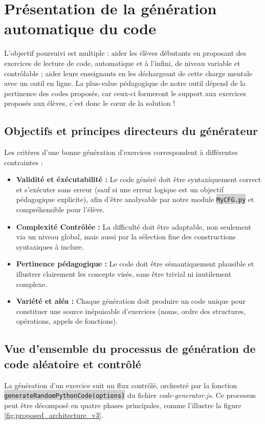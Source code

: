 \documentclass[11pt,a4paper]{article}
\newcommand{\code}[1]{\colorbox{lightgray}{\texttt{\small #1}}}
\newcommand{\filepath}[1]{\textit{#1}}
\begin{document}
\clearpage
\section{Présentation de la génération automatique du code}
L'objectif poursuivi est multiple : aider les élèves débutants en proposant des exercices de lecture de code, automatique et à l'infini, de niveau variable et contrôlable ; aider leurs enseignants en les déchargeant de cette charge mentale avec un outil en ligne. La plus-value pédagogique de notre outil dépend de la pertinence des codes proposés, car ceux-ci formeront le support aux exercices proposés aux élèves, c'est donc le cœur de la solution !

\subsection{Objectifs et principes directeurs du générateur}
Les critères d'une bonne génération d'exercices correspondent à différentes contraintes : \begin{itemize}
    \item \textbf{Validité et éxécutabilité :} Le code généré doit être syntaxiquement correct et s'exécuter sans erreur (sauf si une erreur logique est un objectif pédagogique explicite), afin d'être analysable par notre module \code{MyCFG.py} et compréhensible pour l'élève.
    \item \textbf{Complexité Contrôlée :} La difficulté doit être adaptable, non seulement via un niveau global, mais aussi par la sélection fine des constructions syntaxiques à inclure.
    \item \textbf{Pertinence pédagogique :} Le code doit être sémantiquement plausible et illustrer clairement les concepts visés, sans être trivial ni inutilement complexe.
    \item \textbf{Variété et aléa :} Chaque génération doit produire un code unique pour constituer une source inépuisable d'exercices  (noms, ordre des structures, opérations, appels de fonctions).
\end{itemize}

\subsection{Vue d'ensemble du processus de génération de code aléatoire et contrôlé}
La génération d'un exercice suit un flux contrôlé, orchestré par la fonction \code{generateRandomPythonCode(options)} du fichier \filepath{code-generator.js}. Ce processus peut être décomposé en quatre phases principales, comme l'illustre la figure \ref{fig:proposed_architecture_v3}.
\end{document}
